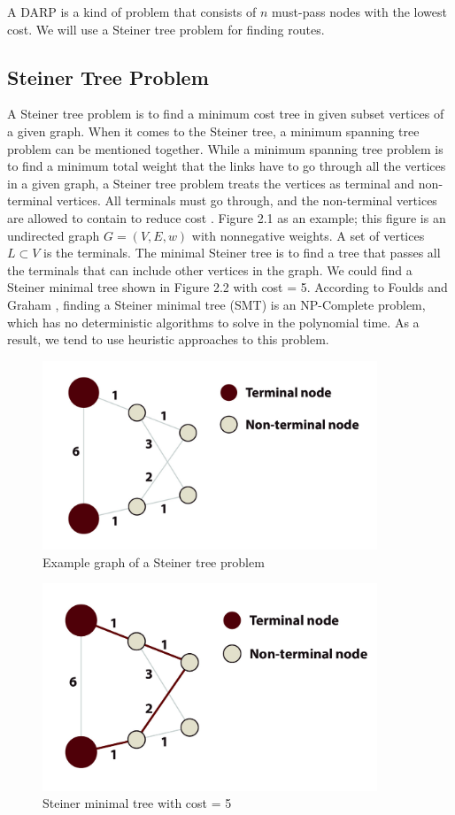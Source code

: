 A DARP is a kind of problem that consists of $n$ must-pass nodes with the lowest cost. We will use a Steiner tree problem for finding routes.

\subsection{Steiner Tree Problem}

A Steiner tree problem is to find a minimum cost tree in given subset vertices of a given graph. When it comes to the Steiner tree, a minimum spanning tree problem can be mentioned together. While a minimum spanning tree problem is to find a minimum total weight that the links have to go through all the vertices in a given graph, a Steiner tree problem treats the vertices as terminal and non-terminal vertices. All terminals must go through, and the non-terminal vertices are allowed to contain to reduce cost \cite{wu_steiner_nodate}. Figure 2.1 as an example; this figure is an undirected graph $G=(V, E, w)$ with nonnegative weights. A set of vertices $L \subset V$ is the terminals. The minimal Steiner tree is to find a tree that passes all the terminals that can include other vertices in the graph. We could find a Steiner minimal tree shown in Figure 2.2 with cost = 5. According to Foulds and Graham \cite{foulds_steiner_1982}, finding a Steiner minimal tree (SMT) is an NP-Complete problem, which has no deterministic algorithms to solve in the polynomial time. As a result, we tend to use heuristic approaches to this problem.

\begin{figure}[htp]
  \centering
  \captionsetup{justification=centering}
  \includegraphics[width=10cm]{figures/steiner_1.jpg}
  \caption{Example graph of a Steiner tree problem}
\end{figure}

\begin{figure}[htp]
  \centering
  \captionsetup{justification=centering}
  \includegraphics[width=10cm]{figures/steiner_2.jpg}
  \caption{Steiner minimal tree with cost = 5}
\end{figure}

